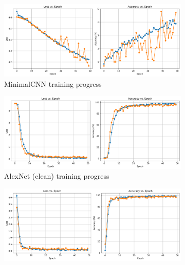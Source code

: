 \documentclass[conference]{IEEEtran}
\begin{document}
\begin{figure}[h]
    \centering
    \begin{subfigure}[b]{0.45\textwidth}
      \centering
      \includegraphics[width=\textwidth]{images/training_progress_MinimalCNN.png}
      \caption{MinimalCNN training progress}
      \label{fig:progress_minimalcnn}
    \end{subfigure}
    \hfill
    \begin{subfigure}[b]{0.45\textwidth}
      \centering
      \includegraphics[width=\textwidth]{images/training_progress_AlexNet_clean.png}
      \caption{AlexNet (clean) training progress}
      \label{fig:progress_alexnet_clean}
    \end{subfigure}    
    \vspace{0.5cm}
    \begin{subfigure}[b]{0.45\textwidth}
      \centering
      \includegraphics[width=\textwidth]{images/training_progress_AlexNet.png}

\end{subfigure}
\end{figure}
\end{document}

